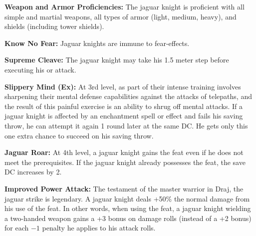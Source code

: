 {
\textbf{Weapon and Armor Proficiencies:} The jaguar knight is proficient with all simple and martial weapons, all types of armor (light, medium, heavy), and shields (including tower shields).

\textbf{Know No Fear:} Jaguar knights are immune to fear-effects.

\textbf{Supreme Cleave:} The jaguar knight may take his 1.5 meter step before executing his  or  attack.

\textbf{Slippery Mind (Ex):} At 3rd level, as part of their intense training involves sharpening their mental defense capabilities against the attacks of telepaths, and the result of this painful exercise is an ability to shrug off mental attacks. If a jaguar knight is affected by an enchantment spell or effect and fails his saving throw, he can attempt it again 1 round later at the same DC. He gets only this one extra chance to succeed on his saving throw.

\textbf{Jaguar Roar:} At 4th level, a jaguar knight gains the  feat even if he does not meet the prerequisites. If the jaguar knight already possesses the  feat, the save DC increases by 2.

\textbf{Improved Power Attack:} The testament of the master warrior in Draj, the jaguar strike is legendary. A jaguar knight deals +50\% the normal damage from his use of the  feat. In other words, when using the  feat, a jaguar knight wielding a two-handed weapon gains a +3 bonus on damage rolls (instead of a +2 bonus) for each $-1$ penalty he applies to his attack rolls.
}